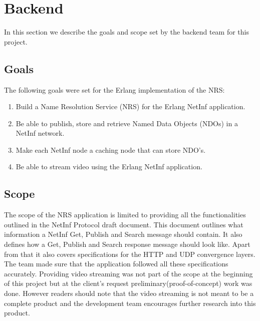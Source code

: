 \section{Backend}
In this section we describe the goals and scope set by the backend team for this project.

\subsection{Goals}
The following goals were set for the Erlang implementation of the NRS:
\begin{enumerate}
 \item {Build a Name Resolution Service (NRS) for the Erlang NetInf application.}\\
 \item {Be able to publish, store and retrieve Named Data Objects (NDOs) in a NetInf network.}\\
 \item {Make each NetInf node a caching node that can store NDO's.}\\
 \item {Be able to stream video using the Erlang NetInf application.}\\
  \end{enumerate}

\subsection{Scope}
The scope of the NRS application is limited to providing all the functionalities outlined in the NetInf Protocol draft document. \cite{netinfproto} This document outlines what information a NetInf Get, Publish and Search message should contain. It also defines how a Get, Publish and Search response message should look like. Apart from that it also covers specifications for the HTTP and UDP convergence layers. The team made sure that the application followed all these specifications accurately. Providing video streaming was not part of the scope at the beginning of this project but at the client's request preliminary(proof-of-concept) work was done. However readers should note that the video streaming is not meant to be a complete product and the development team encourages further research into this product.
